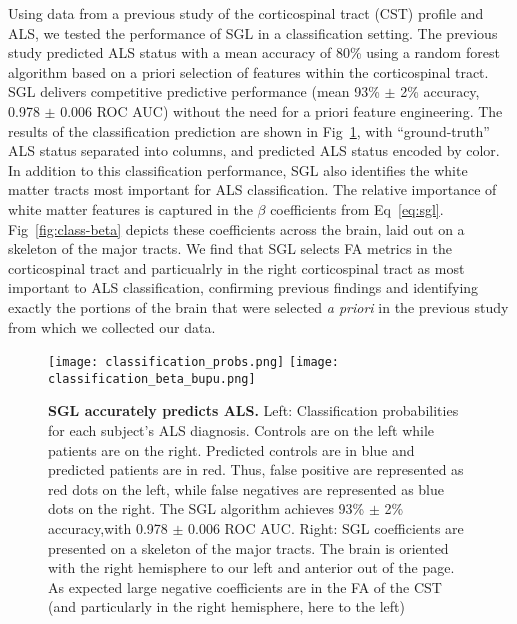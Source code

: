 Using data from a previous study of the corticospinal tract (CST) profile and
ALS\cite{sarica2017corticospinal}, we tested the performance of SGL in a
classification setting. The previous study predicted ALS status with a mean
accuracy of 80\% using a random forest algorithm based on a priori selection of
features within the corticospinal tract. SGL delivers competitive predictive
performance (mean 93\% $\pm$ 2\% accuracy, 0.978 $\pm$ 0.006 ROC AUC) without
the need for a priori feature engineering. The results of the classification
prediction are shown in Fig~\ref{fig:class-results}, with ``ground-truth'' ALS
status separated into columns, and predicted ALS status encoded by color. In
addition to this classification performance, SGL also identifies the white
matter tracts most important for ALS classification. The relative importance of
white matter features is captured in the $\beta$ coefficients from
Eq~\eqref{eq:sgl}. Fig~\ref{fig:class-beta} depicts these coefficients across
the brain, laid out on a skeleton of the major tracts. We find that SGL selects
FA metrics in the corticospinal tract and particualrly in the right
corticospinal tract as most important to ALS classification, confirming previous
findings\cite{van2011upper, toosy2003diffusion, sarica2014tractography,
sage2007quantitative, sage2009quantitative, karlsborg2004corticospinal,
ellis1999diffusion, cosottini2005diffusion, ciccarelli2009investigation,
abe2010voxel} and identifying exactly the portions of the brain that were
selected \emph{a priori} in the previous study from which we collected our
data\cite{sarica2017corticospinal}.

\begin{figure}[!h]
    \centering
    \texttt{[image: classification\_probs.png]}
    \texttt{[image: classification\_beta\_bupu.png]}

    \caption{{\bf SGL accurately predicts ALS.}
        Left: Classification probabilities for each subject's ALS diagnosis.
        Controls are on the left while patients are on the right. Predicted
        controls are in blue and predicted patients are in red. Thus, false
        positive are represented as red dots on the left, while false negatives
        are represented as blue dots on the right. The SGL algorithm achieves
        93\% $\pm$ 2\% accuracy,with 0.978 $\pm$ 0.006 ROC AUC. Right: SGL
        coefficients are presented on a skeleton of the major tracts. The brain
        is oriented with the right hemisphere to our left and anterior out of
        the page. As expected large negative coefficients are in the FA of the
        CST (and particularly in the right hemisphere, here to the left)}
    \label{fig:class-results}
\end{figure}



